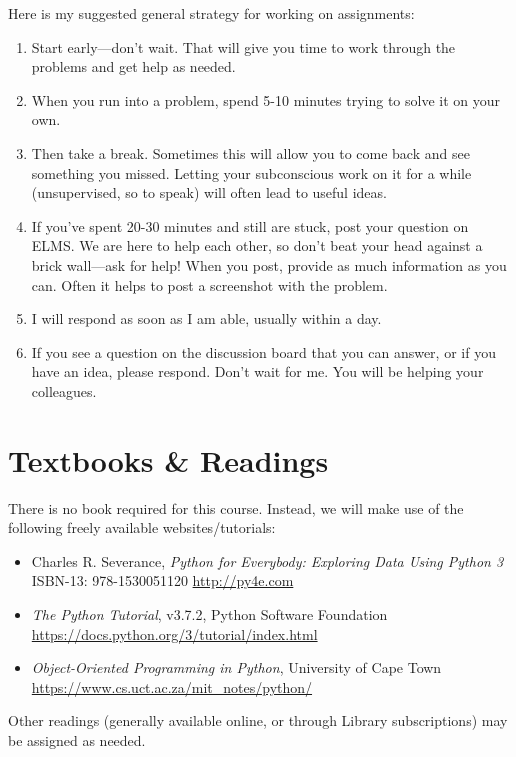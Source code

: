 \documentclass[11pt]{article}
\begin{document}
Here is my suggested general strategy for working on assignments:
\begin{enumerate}
	\item Start early---don't wait. That will give you time to work through the problems and get help as needed.
	\item When you run into a problem, spend 5-10 minutes trying to solve it on your own.
	\item Then take a break. Sometimes this will allow you to come back and see something you missed. Letting your subconscious work on it for a while (unsupervised, so to speak) will often lead to useful ideas.
	\item If you’ve spent 20-30 minutes and still are stuck, post your question on ELMS. We are here to help each other, so don’t beat your head against a brick wall---ask for help! When you post, provide as much information as you can. Often it helps to post a screenshot with the problem.
	\item I will respond as soon as I am able, usually within a day.
	\item If you see a question on the discussion board that you can answer, or if you have an idea, please respond. Don’t wait for me. You will be helping your colleagues.
\end{enumerate}

\section{Textbooks \& Readings}
There is no book required for this course. Instead, we will make use of the following freely available websites/tutorials:
\begin{itemize}
	\item Charles R. Severance, \textit{Python for Everybody: Exploring Data Using Python 3} ISBN-13: 978-1530051120 \url{http://py4e.com}
	\item \textit{The Python Tutorial}, v3.7.2, Python Software Foundation \url{https://docs.python.org/3/tutorial/index.html}
	\item \textit{Object-Oriented Programming in Python}, University of Cape Town \url{https://www.cs.uct.ac.za/mit_notes/python/}
\end{itemize}

Other readings (generally available online, or through Library subscriptions) may be assigned as needed.
\end{document}
